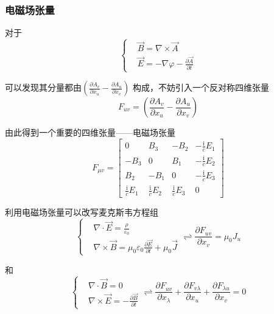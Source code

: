 \documentclass[UTF8]{ctexart}
\begin{document}
    \subsubsection{电磁场张量}
    对于
    \begin{equation}
        \left \{ \begin{aligned}
            &\vec{B}= \nabla \times \vec{A} \\
            &\vec{E} = - \nabla \varphi - \frac{\partial \vec{A}}{\partial t}
        \end{aligned} \right.
    \end{equation}

\noindent 可以发现其分量都由$\left(\frac{\partial A_v}{\partial x_u} - \frac{\partial A_u}{\partial x_v}\right)$ 构成，不妨引入一个反对称四维张量
\begin{equation}
    F_{uv} = \left(\frac{\partial A_v}{\partial x_u} - \frac{\partial A_u}{\partial x_v}\right)
\end{equation}

\noindent 由此得到一个重要的四维张量——电磁场张量
\begin{equation}
F_{\mu v}=\left[\begin{array}{cccc}{0} & {B_{3}} & {-B_{2}} & {-\frac{\mathrm{i}}{c} E_{1}} \\ {-B_{3}} & {0} & {B_{1}} & {-\frac{\mathrm{i}}{c} E_{2}} \\ {B_{2}} & {-B_{1}} & {0} & {-\frac{\mathrm{i}}{c} E_{3}} \\ {\frac{\mathrm{i}}{c} E_{1}} & {\frac{\mathrm{i}}{c} E_{2}} & {\frac{\mathrm{i}}{c} E_{3}} & {0}\end{array}\right]
\end{equation}

    利用电磁场张量可以改写麦克斯韦方程组
    \begin{equation}
        \left \{ \begin{aligned}
            &\nabla \cdot \vec{E} = \frac{\rho}{\varepsilon_0} \\ 
            &\nabla \times \vec{B} = \mu_0 \varepsilon_0 \frac{\partial \vec{E}}{\partial t}+ \mu_0 \vec{J}
        \end{aligned} \right. \rightleftharpoons \frac{\partial F_{u v}}{\partial x_v} = \mu_0 J_u
    \end{equation}

\noindent 和
\begin{equation}
    \left \{ \begin{aligned}
        &\nabla \cdot \vec{B} =0 \\ 
        &\nabla \times \vec{E} = - \frac{\partial \vec{B}}{\partial t} 
    \end{aligned} \right. \rightleftharpoons \frac{\partial F_{uv}}{\partial x_{\lambda}}+\frac{\partial F_{v\lambda}}{\partial x_u}+\frac{\partial F_{\lambda u}}{\partial x_v} = 0
\end{equation}
\end{document}
